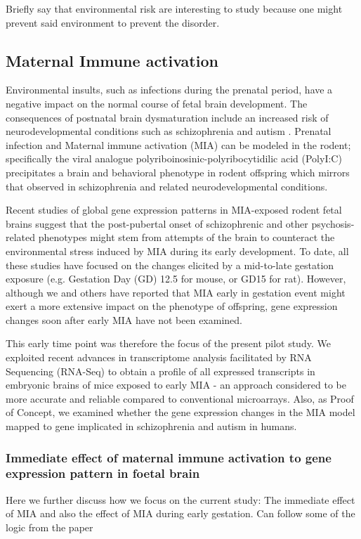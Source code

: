 Briefly say that environmental risk are interesting to study because one might prevent said environment to prevent the disorder. 
\subsection{Maternal Immune activation}
Environmental insults, such as infections during the prenatal period, have a negative impact on the normal course of fetal brain development.
The consequences of postnatal brain dysmaturation\cite{Meyer2007a} include an increased risk of neurodevelopmental conditions such as  schizophrenia and autism \cite{Fatemi2009a,Bale2010}. 
Prenatal infection and Maternal immune activation (MIA) can be modeled in the rodent; specifically the viral analogue polyriboinosinic-polyribocytidilic acid (PolyI:C) precipitates a brain and behavioral phenotype in rodent offspring which mirrors that observed in schizophrenia and related neurodevelopmental conditions\cite{Li2009c,Meyer2008b,Li2010a,Ashwood2006}.

Recent studies of global gene expression patterns in MIA-exposed rodent fetal brains\cite{Garbett2012,Oskvig2012} suggest that the post-pubertal onset of schizophrenic and other psychosis-related phenotypes might stem from attempts of the brain to counteract the environmental stress induced by MIA during its early development\cite{Garbett2012}.
To date, all these studies have focused on the changes elicited by a mid-to-late gestation exposure (e.g. Gestation Day (GD) 12.5 for mouse, or GD15 for rat). 
However, although we and others\cite{Meyer2007a,Li2009c,Li2010a} have reported that MIA early in gestation event might exert a more extensive impact on the phenotype of offspring, gene expression changes soon after early MIA have not been examined. 

This early time point was therefore the focus of the present pilot study. 
We exploited recent advances in transcriptome analysis facilitated by RNA Sequencing (RNA-Seq) to obtain a profile of all expressed transcripts in embryonic brains of mice exposed to early MIA - an approach considered to be more accurate and reliable compared to conventional microarrays\cite{Wang2009b}.
Also, as Proof of Concept, we examined whether the gene expression changes in the MIA model mapped to gene implicated in schizophrenia and autism in humans.

\subsubsection{Immediate effect of maternal immune activation to gene expression pattern in foetal brain}
Here we further discuss how we focus on the current study: The immediate effect of MIA and also the effect of MIA during early gestation. 
Can follow some of the logic from the paper

